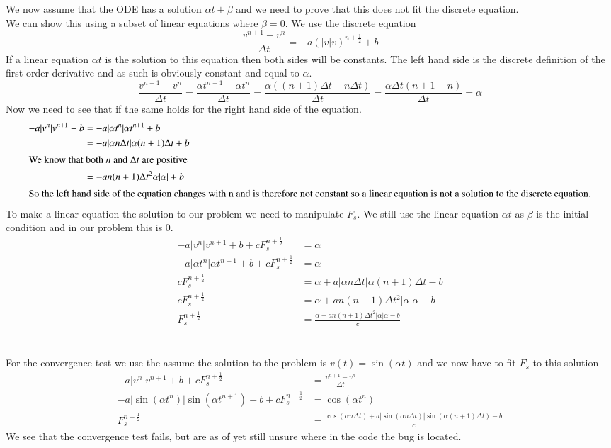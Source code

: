 \documentclass[12pt, norsk, a4paper]{article}
\begin{document}
\section{}
We now assume that the ODE has a solution $\alpha t + \beta$ and we need to
prove that this does not fit the discrete equation. \\
We can show this using a subset of linear equations where $\beta=0$.
We use the discrete equation 
\[\frac{v^{n+1}-v^n}{\Delta t} = -a (|v|v)^{n+\frac{1}{2}} + b \]
If a linear equation $\alpha t$ is the solution to this equation then both
sides will be constants. The left hand side is the discrete definition of the
first order derivative and as such is obviously constant and equal to $\alpha$.
\[\frac{v^{n+1}-v^n}{\Delta t} = \frac{\alpha t^{n+1}-\alpha t^n}{\Delta t} =
\frac{\alpha((n+1)\Delta t - n \Delta t)}{\Delta t} = \frac{\alpha \Delta t
    (n+1-n)}{\Delta t} = \alpha \]
Now we need to see that if the same holds for the right hand side of the
equation.
\begin{align*}
-a |v^n|v^{n+1} + b &= -a |\alpha t^n|\alpha t^{n+1} + b \\
        &= -a |\alpha n \Delta t|\alpha (n+1) \Delta t + b \\
\intertext{We know that both $n$ and $\Delta t$ are positive}
&= -a n(n+1) \Delta t^2 \alpha |\alpha| + b \\
\intertext{So the left hand side of the equation changes with n and is
    therefore not constant so a linear equation is not a solution to the
        discrete equation.}
\end{align*}
To make a linear equation the solution to our problem we need to manipulate
$F_s$. We still use the linear equation $\alpha t$ as $\beta$ is the initial
condition and in our problem this is 0. 
\begin{align*}
-a |v^n|v^{n+1} + b + cF_s^{n+\frac{1}{2}} & = \alpha \\
-a |\alpha t^n|\alpha t^{n+1} + b + cF_s^{n+\frac{1}{2}} &= \alpha \\
cF_s^{n+\frac{1}{2}} &= \alpha + a |\alpha n \Delta t|\alpha (n+1) \Delta t - b
\\
cF_s^{n+\frac{1}{2}} &= \alpha + a n(n+1)\Delta t^2 |\alpha| \alpha -b \\
F_s^{n+\frac{1}{2}} &= \frac{\alpha + a n(n+1)\Delta t^2 |\alpha| \alpha -b }{c}
\end{align*}
\section{}
For the convergence test we use the assume the solution to the problem is
$v(t)= \sin(\alpha t)$ and we now have to fit $F_s$ to this solution
\begin{align*}
-a |v^n|v^{n+1} + b + cF_s^{n+\frac{1}{2}} &= \frac{v^{n+1}-v^n}{\Delta t} \\
-a |\sin(\alpha t^n)| \sin(\alpha t^{n+1}) + b + cF_s^{n+\frac{1}{2}} &=
\cos(\alpha t^n) \\
F_s^{n+\frac{1}{2}} &= \frac{\cos(\alpha n \Delta t) + a |\sin(\alpha n \Delta
        t)| \sin (\alpha (n+1) \Delta t) - b}{c}
\end{align*}
We see that the convergence test fails, but are as of yet still unsure where
 in the code the bug is located.
\end{document}
